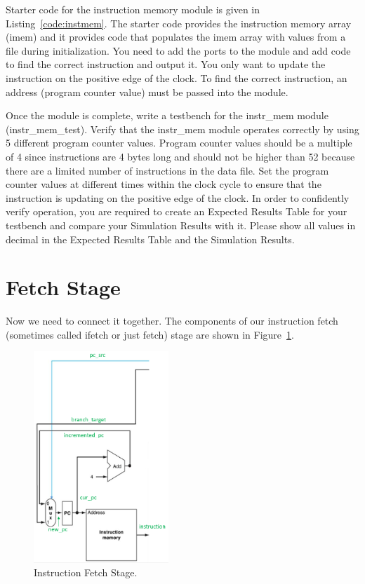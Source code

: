 
Starter code for the instruction memory module is given in Listing~\ref{code:instmem}.  The starter code provides the instruction memory array (imem) and it provides code that populates the imem array with values from a file during initialization.  You need to add the ports to the module and add code to find the correct instruction and output it.  You only want to update the instruction on the positive edge of the clock.  To find the correct instruction, an address (program counter value) must be passed into the module.  

Once the module is complete, write a testbench for the instr\_mem module (instr\_mem\_test).  Verify that the instr\_mem module operates correctly by using 5 different program counter values.  Program counter values should be a multiple of 4 since instructions are 4 bytes long and should not be higher than 52 because there are a limited number of instructions in the data file.  Set the program counter values at different times within the clock cycle to ensure that the instruction is updating on the positive edge of the clock.    In order to confidently verify operation, you are required to create an Expected Results Table for your testbench and compare your Simulation Results with it.  Please show all values in decimal in the Expected Results Table and the Simulation Results.

\section{Fetch Stage}
Now we need to connect it together.  The components of our instruction fetch (sometimes called ifetch or just fetch) stage are shown in Figure~\ref{fig:fetch}.

\begin{figure}
\caption{Instruction Fetch Stage.}\label{fig:fetch}
\begin{center}
\includegraphics[width=2in]{../images/pipeline_fetch.png}
\end{center}
\end{figure}

